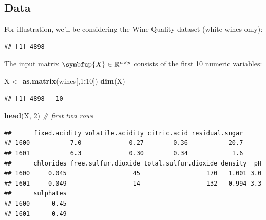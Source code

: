 \documentclass[10pt,b5paper,krantz1]{krantz}
\newenvironment{Shaded}{\begin{snugshade}}{\end{snugshade}}
\newcommand{\CommentTok}[1]{\textcolor[rgb]{0.37,0.37,0.37}{\textit{#1}}}
\newcommand{\DataTypeTok}[1]{\textcolor[rgb]{0.27,0.27,0.27}{#1}}
\newcommand{\DecValTok}[1]{\textcolor[rgb]{0.06,0.06,0.06}{#1}}
\newcommand{\KeywordTok}[1]{\textcolor[rgb]{0.27,0.27,0.27}{\textbf{#1}}}
\newcommand{\NormalTok}[1]{#1}
\newcommand{\OperatorTok}[1]{\textcolor[rgb]{0.43,0.43,0.43}{\textbf{#1}}}
\newcommand{\OtherTok}[1]{\textcolor[rgb]{0.37,0.37,0.37}{#1}}
\newcommand{\StringTok}[1]{\textcolor[rgb]{0.5,0.5,0.5}{#1}}
\renewcommand{\mathbf}[1]{\symbfup{#1}}
\begin{document}
\hypertarget{data-1}{%
\subsection{Data}\label{data-1}}

For illustration, we'll be considering the Wine Quality dataset
(white wines only):

\begin{Shaded}
\end{Shaded}

\begin{verbatim}
## [1] 4898
\end{verbatim}

The input matrix \(\mathbf{X}\in\mathbb{R}^{n\times p}\)
consists of the first 10 numeric variables:

\begin{Shaded}
\begin{Highlighting}[]
\NormalTok{X <-}\StringTok{ }\KeywordTok{as.matrix}\NormalTok{(wines[,}\DecValTok{1}\OperatorTok{:}\DecValTok{10}\NormalTok{])}
\KeywordTok{dim}\NormalTok{(X)}
\end{Highlighting}
\end{Shaded}

\begin{verbatim}
## [1] 4898   10
\end{verbatim}

\begin{Shaded}
\begin{Highlighting}[]
\KeywordTok{head}\NormalTok{(X, }\DecValTok{2}\NormalTok{) }\CommentTok{# first two rows}
\end{Highlighting}
\end{Shaded}

\begin{verbatim}
##      fixed.acidity volatile.acidity citric.acid residual.sugar
## 1600           7.0             0.27        0.36           20.7
## 1601           6.3             0.30        0.34            1.6
##      chlorides free.sulfur.dioxide total.sulfur.dioxide density  pH
## 1600     0.045                  45                  170   1.001 3.0
## 1601     0.049                  14                  132   0.994 3.3
##      sulphates
## 1600      0.45
## 1601      0.49
\end{verbatim}
\end{document}
